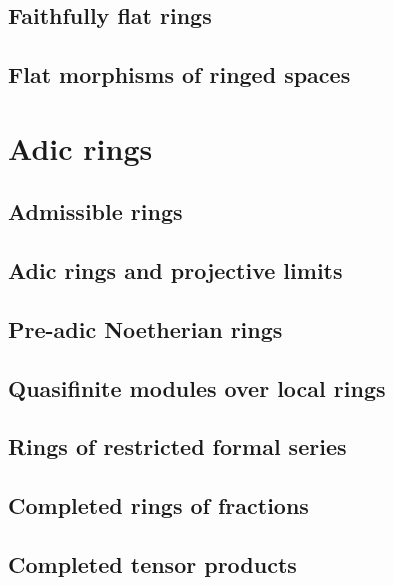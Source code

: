 \documentclass[10pt,oneside]{book}
\begin{document}
\subsection{Faithfully flat rings}
\label{0-prelim-6.6}

\subsection{Flat morphisms of ringed spaces}
\label{0-prelim-6.7}

\section{Adic rings}
\label{0-prelim-7}

\subsection{Admissible rings}
\label{0-prelim-7.1}

\subsection{Adic rings and projective limits}
\label{0-prelim-7.2}

\subsection{Pre-adic Noetherian rings}
\label{0-prelim-7.3}

\subsection{Quasifinite modules over local rings}
\label{0-prelim-7.4}

\subsection{Rings of restricted formal series}
\label{0-prelim-7.5}

\subsection{Completed rings of fractions}
\label{0-prelim-7.6}

\subsection{Completed tensor products}
\label{0-prelim-7.7}
\end{document}
